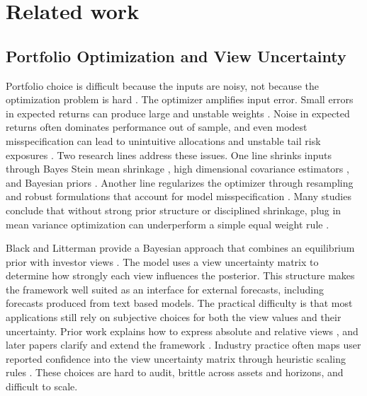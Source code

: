 \section{Related work}

\subsection{Portfolio Optimization and View Uncertainty}
Portfolio choice is difficult because the inputs are noisy, not because the optimization problem is hard \citep{markowitz1952portfolio}. The optimizer amplifies input error. Small errors in expected returns can produce large and unstable weights \citep{jobson1980estimation, best1991sensitivity}. Noise in expected returns often dominates performance out of sample, and even modest misspecification can lead to unintuitive allocations and unstable tail risk exposures \citep{merton1980estimating, chopra1993effect}. Two research lines address these issues. One line shrinks inputs through Bayes Stein mean shrinkage \citep{jorion1986bayes}, high dimensional covariance estimators \citep{ledoit2003improved, ledoit2004well}, and Bayesian priors \citep{avramov2002stock, pastor2000portfolio}. Another line regularizes the optimizer through resampling \citep{michaud1989markowitz} and robust formulations that account for model misspecification \citep{garlappi2007portfolio, bertsimas2011theory}. Many studies conclude that without strong prior structure or disciplined shrinkage, plug in mean variance optimization can underperform a simple equal weight rule \citep{demiguel2009optimal}.

Black and Litterman provide a Bayesian approach that combines an equilibrium prior with investor views \citep{black1992global}. The model uses a view uncertainty matrix to determine how strongly each view influences the posterior. This structure makes the framework well suited as an interface for external forecasts, including forecasts produced from text based models. The practical difficulty is that most applications still rely on subjective choices for both the view values and their uncertainty. Prior work explains how to express absolute and relative views \citep{he2002intuition}, and later papers clarify and extend the framework \citep{satchell2007demystification, ccela2021mean}. Industry practice often maps user reported confidence into the view uncertainty matrix through heuristic scaling rules \citep{idzorek2007step}. These choices are hard to audit, brittle across assets and horizons, and difficult to scale.

